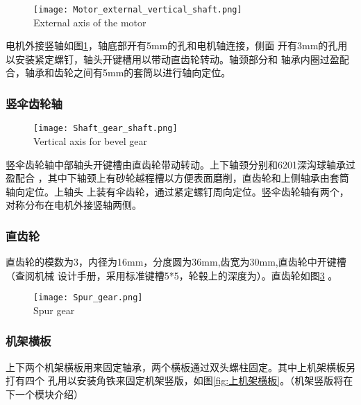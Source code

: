 \begin{figure}[!htp]
  \centering
  \texttt{[image: Motor\_external\_vertical\_shaft.png]} \\
    {External axis of the motor}
  \label{fig:电机外接竖轴}
\end{figure}
电机外接竖轴如图\ref{fig:电机外接竖轴}，轴底部开有5mm的孔和电机轴连接，侧面
开有3mm的孔用以安装紧定螺钉，轴头开键槽用以带动直齿轮转动。轴颈部分和
轴承内圈过盈配合，轴承和齿轮之间有5mm的套筒以进行轴向定位。


\subsubsection{竖伞齿轮轴}

\begin{figure}[!htp]
  \centering
  \texttt{[image: Shaft\_gear\_shaft.png]} \\
    {Vertical axis for bevel gear}
  \label{fig:竖伞齿轮轴}
\end{figure}
竖伞齿轮轴中部轴头开键槽由直齿轮带动转动。上下轴颈分别和6201深沟球轴承过盈配合
，其中下轴颈上有砂轮越程槽以方便表面磨削，直齿轮和上侧轴承由套筒轴向定位。上轴头
上装有伞齿轮，通过紧定螺钉周向定位。竖伞齿轮轴有两个，对称分布在电机外接竖轴两侧。

\subsubsection{直齿轮}

直齿轮的模数为3，内径为16mm，分度圆为36mm,齿宽为30mm,直齿轮中开键槽（查阅机械
设计手册，采用标准键槽5*5，轮毂上的深度为）。直齿轮如图\ref{fig:直齿轮} 。

\begin{figure}[!htp]
  \centering
  \texttt{[image: Spur\_gear.png]} \\
    {Spur gear}
  \label{fig:直齿轮}
\end{figure}

\subsubsection{机架横板}

上下两个机架横板用来固定轴承，两个横板通过双头螺柱固定。其中上机架横板另打有四个
孔用以安装角铁来固定机架竖版，如图\ref{fig:上机架横板}。（机架竖版将在下一个模块介绍）
\\

